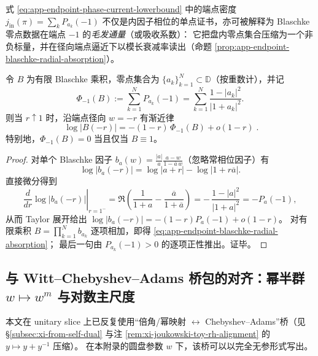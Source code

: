 \begin{remark}[端点毛发通量与径向吸收系数]\label{rem:app-endpoint-hair-flux-absorption}
式 \eqref{eq:app-endpoint-phase-current-lowerbound} 中的端点密度
\(
j_{\mathrm{in}}(\pi)=\sum_k P_{a_k}(-1)
\)
不仅是内因子相位的单点证书，亦可被解释为 Blaschke 零点数据在端点 \(-1\) 的\emph{毛发通量}（或吸收系数）：
它把盘内零点集合压缩为一个非负标量，并在径向端点逼近下以模长衰减率读出（命题 \ref{prop:app-endpoint-blaschke-radial-absorption}）。
\end{remark}

\begin{proposition}\label{prop:app-endpoint-blaschke-radial-absorption}
令 \(B\) 为有限 Blaschke 乘积，零点集合为 \(\{a_k\}_{k=1}^{N}\subset\mathbb{D}\)（按重数计），并记
\[
\Phi_{-1}(B):=\sum_{k=1}^{N}P_{a_k}(-1)=\sum_{k=1}^{N}\frac{1-|a_k|^2}{|1+a_k|^2}.
\]
则当 \(r\uparrow 1\) 时，沿端点径向 \(w=-r\) 有渐近律
\begin{equation}\label{eq:app-endpoint-blaschke-radial-absorption}
\boxed{\;
\log|B(-r)|=-(1-r)\,\Phi_{-1}(B)+o(1-r)\; }.
\end{equation}
特别地，\(\Phi_{-1}(B)=0\) 当且仅当 \(B\equiv 1\)。
\end{proposition}

\begin{proof}
对单个 Blaschke 因子 \(b_a(w)=\frac{|a|}{a}\frac{a-w}{1-\overline a\,w}\)（忽略常相位因子）有
\[
\log|b_a(-r)|
=\log|a+r|-\log|1+r\overline a|.
\]
直接微分得到
\[
\left.\frac{d}{dr}\log|b_a(-r)|\right|_{r=1^-}
=\Re\!\left(\frac{1}{1+a}-\frac{\overline a}{1+\overline a}\right)
=-\,\frac{1-|a|^2}{|1+a|^2}
=-P_a(-1),
\]
从而 Taylor 展开给出
\(
\log|b_a(-r)|=-(1-r)P_a(-1)+o(1-r)
\)。
对有限乘积 \(B=\prod_{k=1}^{N}b_{a_k}\) 逐项相加，即得 \eqref{eq:app-endpoint-blaschke-radial-absorption}；
最后一句由 \(P_{a_k}(-1)>0\) 的逐项正性推出。证毕。
\end{proof}

\subsection{与 Witt--Chebyshev--Adams 桥包的对齐：幂半群 \texorpdfstring{$w\mapsto w^m$}{w->w^m} 与对数主尺度}\label{subsec:unit-disk-witt-chebyshev}
本文在 unitary slice 上已反复使用“倍角/幂映射 \(\leftrightarrow\) Chebyshev--Adams”桥（见 \S\ref{subsec:xi-from-self-dual} 与注 \ref{rem:xi-joukowski-toy-rh-alignment} 的 \(y\mapsto y+y^{-1}\) 压缩）。
在本附录的圆盘参数 \(w\) 下，该桥可以以完全无参形式写出。

